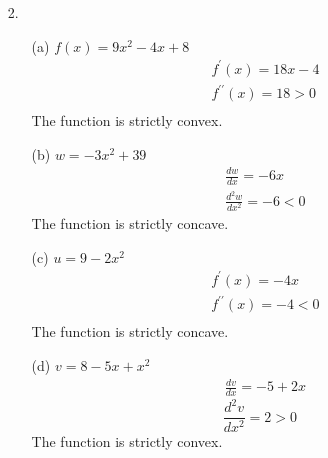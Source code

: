 \documentclass{./../../Latex/homework}
\begin{document}
\begin{enumerate}
\item[2.]
\begin{enumerate}

\item[(a)] $f(x)=9 x^{2}-4 x+8$
$$
\begin{aligned}
&f^{\prime}(x)=18 x-4 \\
&f^{\prime \prime}(x)=18>0 \\
\end{aligned}
$$
The function is strictly convex. \\

\item[(b)]$w=-3 x^{2}+39$
$$
\begin{aligned}
&\frac{d w}{d x}=-6 x \\
&\frac{d^{2} w}{d x^{2}}=-6<0
\end{aligned}
$$
The function is strictly concave. \\

\item[(c)]$u=9-2 x^{2}$
$$
\begin{aligned}
&f^{\prime}(x)=-4 x \\
&f^{\prime \prime}(x)=-4<0 \\
\end{aligned}
$$
The function is strictly concave. \\

\item[(d)]$v=8-5 x+x^{2}$
$$
\begin{aligned}
&\frac{d v}{d x}=-5+2 x
\end{aligned}
$$
$$
\frac{d^{2} v}{d x^{2}}=2>0
$$
The function is strictly convex.

\end{enumerate}


\end{enumerate}
\end{document}
